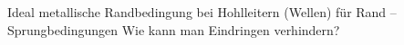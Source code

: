 \begin{question}[section=5,subsection=53,name={Randbedingungen in Hohlleiter},difficulty=,type=mdl,mode=exm,tags={}]
	Ideal metallische Randbedingung bei Hohlleitern (Wellen) für Rand –Sprungbedingungen
	Wie kann man Eindringen verhindern?
\end{question}
\begin{solution}
	
\end{solution}